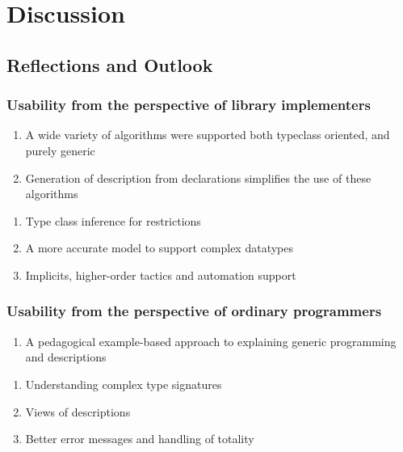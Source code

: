 \documentclass{ituthesis}
\theoremstyle{break}
\begin{document}
\chapter{Discussion}
\label{cha:Discussion}

\section{Reflections and Outlook}
\label{sec:ReflectionsandOutlook}

\subsection{Usability from the perspective of library implementers}
\label{sub:Usabilityfromtheperspectiveoflibraryimplementers}

\begin{enumerate}
  \item A wide variety of algorithms were supported both typeclass oriented, and purely generic
  \item Generation of description from declarations simplifies the use of these algorithms
\end{enumerate}

\begin{enumerate}
  \item Type class inference for restrictions
  \item A more accurate model to support complex datatypes
  \item Implicits, higher-order tactics and automation support
\end{enumerate}

\subsection{Usability from the perspective of ordinary programmers}
\label{sub:Usabilityfromtheperspectiveofordinaryprogrammers}

\begin{enumerate}
  \item A pedagogical example-based approach to explaining generic programming and descriptions
\end{enumerate}

\begin{enumerate}
  \item Understanding complex type signatures
  \item Views of descriptions
  \item Better error messages and handling of totality
\end{enumerate}
\end{document}
